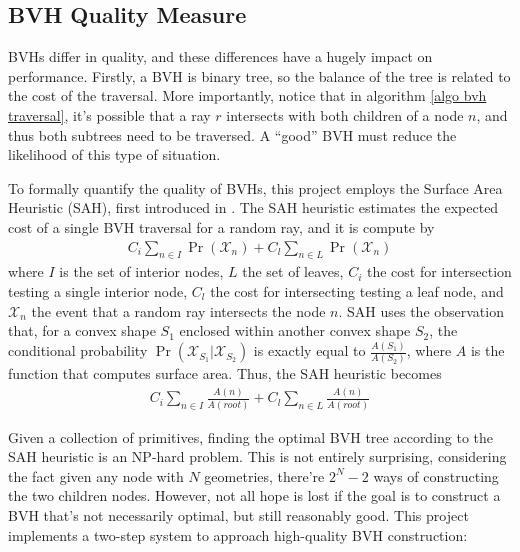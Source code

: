 \subsection{BVH Quality Measure}

BVHs differ in quality, and these differences have a hugely impact on performance. Firstly, a BVH is binary tree, so the balance of the tree is related to the cost of the traversal. More importantly, notice that in algorithm \ref{algo bvh traversal}, it's possible that a ray $r$ intersects with both children of a node $n$, and thus both subtrees need to be traversed. A ``good'' BVH must reduce the likelihood of this type of situation. 

To formally quantify the quality of BVHs, this project employs the Surface Area Heuristic (SAH), first introduced in \cite{goldsmith1987automatic}. The SAH heuristic estimates the expected cost of a single BVH traversal for a random ray, and it is compute by
\begin{align*}
    C_i \sum_{n\in I} \Pr(\mathcal{X}_n) + C_l \sum_{n\in L} \Pr(\mathcal{X}_n)
\end{align*}
where $I$ is the set of interior nodes, $L$ the set of leaves, $C_i$ the cost for intersection testing a single interior node, $C_l$ the cost for intersecting testing a leaf node, and $\mathcal{X}_n$ the event that a random ray intersects the node $n$. SAH uses the observation that, for a convex shape $S_1$ enclosed within another convex shape $S_2$, the conditional probability $\Pr(\mathcal{X}_{S_1} | \mathcal{X}_{S_2})$ is exactly equal to $\frac{A(S_1)}{A(S_2)}$, where $A$ is the function that computes surface area. Thus, the SAH heuristic becomes
\begin{align*}
    C_i \sum_{n\in I} \frac{A(n)}{A(root)} + C_l \sum_{n\in L} \frac{A(n)}{A(root)}
\end{align*}

Given a collection of primitives, finding the optimal BVH tree according to the SAH heuristic is an NP-hard problem\cite{bvh_optimize}. This is not entirely surprising, considering the fact given any node with $N$ geometries, there're $2^N-2$ ways of constructing the two children nodes. However, not all hope is lost if the goal is to construct a BVH that's not necessarily optimal, but still reasonably good. This project implements a two-step system to approach high-quality BVH construction:

